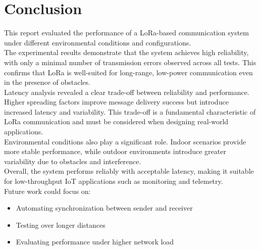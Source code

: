 \documentclass[14pt]{article}
\begin{document}
\section{Conclusion}
This report evaluated the performance of a LoRa-based communication system under different environmental conditions and configurations. \\
The experimental results demonstrate that the system achieves high reliability, with only a minimal number of transmission errors observed across all tests. This confirms that LoRa is well-suited for long-range, low-power communication even in the presence of obstacles. \\
Latency analysis revealed a clear trade-off between reliability and performance. Higher spreading factors improve message delivery success but introduce increased latency and variability. This trade-off is a fundamental characteristic of LoRa communication and must be considered when designing real-world applications. \\
Environmental conditions also play a significant role. Indoor scenarios provide more stable performance, while outdoor environments introduce greater variability due to obstacles and interference. \\
Overall, the system performs reliably with acceptable latency, making it suitable for low-throughput IoT applications such as monitoring and telemetry. \\
Future work could focus on:
\begin{itemize}
    \item Automating synchronization between sender and receiver
    \item Testing over longer distances
    \item Evaluating performance under higher network load
\end{itemize}
\end{document}
